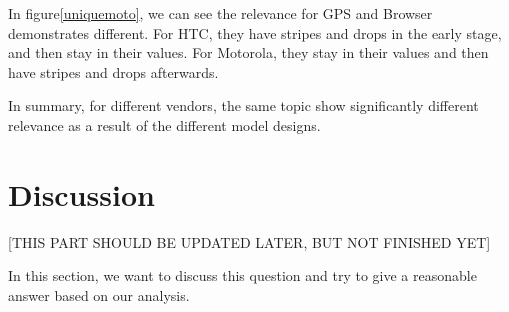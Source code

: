 \documentclass[10pt, conference, compsocconf]{IEEEtran}
\begin{document}
In figure\ref{uniquemoto}, we can see the relevance for GPS and Browser demonstrates different. For HTC, they have stripes and drops in the early stage, and then stay in their values. For Motorola, they stay in their values and then have stripes and drops afterwards.


In summary, for different vendors, the same topic show significantly different relevance as a result of the different model designs.


\section{Discussion}

[THIS PART SHOULD BE UPDATED LATER, BUT NOT FINISHED YET]

In this section, we want to discuss this question and try to give a reasonable answer based on our analysis.
\end{document}
